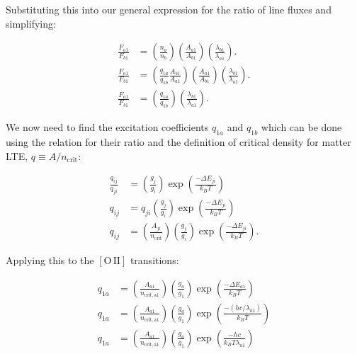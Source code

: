\documentclass[12pt]{article}
\begin{document}
Substituting this into our general expression for the ratio of line fluxes and simplifying:

\begin{equation*}
\begin{split}
\frac{F_{a1}}{F_{b1}} &= \left(\frac{n_a}{n_b}\right) \left(\frac{A_{a1}}{A_{b1}}\right) \left(\frac{\lambda_{b1}}{\lambda_{a1}}\right). \\
\frac{F_{a1}}{F_{b1}} &= \left(\frac{q_{1a}}{q_{1b}}\frac{A_{b1}}{A_{a1}}\right) \left(\frac{A_{a1}}{A_{b1}}\right) \left(\frac{\lambda_{b1}}{\lambda_{a1}}\right). \\
\frac{F_{a1}}{F_{b1}} &= \left(\frac{q_{1a}}{q_{1b}}\right) \left(\frac{\lambda_{b1}}{\lambda_{a1}}\right).
\end{split}
\end{equation*}

We now need to find the excitation coefficients $q_{1a}$ and $q_{1b}$ which can be done using the relation for their ratio and the definition of critical density for matter LTE, $q \equiv A/n_\mathrm{crit}$:

\begin{equation*}
\begin{split}
\frac{q_{ij}}{q_{ji}} &= \left(\frac{g_j}{g_i}\right) \exp \left(\frac{- \Delta E_{ji}}{k_BT}\right) \\
q_{ij} &= q_{ji} \left(\frac{g_j}{g_i}\right) \exp \left(\frac{- \Delta E_{ji}}{k_BT}\right) \\
q_{ij} &= \left(\frac{A_{ji}}{n_\mathrm{crit}}\right) \left(\frac{g_j}{g_i}\right) \exp \left(\frac{- \Delta E_{ji}}{k_BT}\right).
\end{split}
\end{equation*}

Applying this to the $\mathrm{[O\,II]}$ transitions:

\begin{equation*}
\begin{split}
q_{1a} &= \left(\frac{A_{a1}}{n_\mathrm{crit,a1}}\right) \left(\frac{g_a}{g_1}\right) \exp \left(\frac{- \Delta E_{a1}}{k_BT}\right) \\
q_{1a} &= \left(\frac{A_{a1}}{n_\mathrm{crit,a1}}\right) \left(\frac{g_a}{g_1}\right) \exp \left(\frac{- (hc/\lambda_{a1})}{k_BT}\right) \\
q_{1a} &= \left(\frac{A_{a1}}{n_\mathrm{crit,a1}}\right) \left(\frac{g_a}{g_1}\right) \exp \left(\frac{- hc}{k_BT\lambda_{a1}}\right)
\end{split}
\end{equation*}
\end{document}
